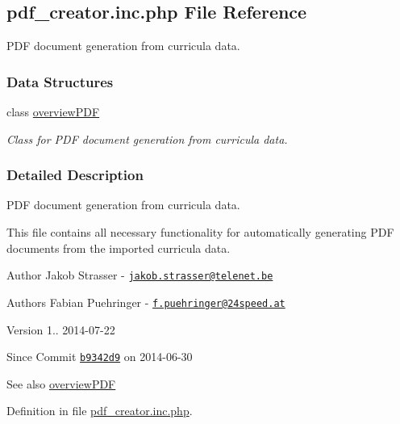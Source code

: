 \hypertarget{pdf__creator_8inc_8php}{\subsection{pdf\+\_\+creator.\+inc.\+php File Reference}
\label{pdf__creator_8inc_8php}
}


P\+D\+F document generation from curricula data.  


\subsubsection*{Data Structures}
\begin{DoxyCompactItemize}
\item 
class \hyperlink{classoverview_p_d_f}{overview\+P\+D\+F}
\begin{DoxyCompactList}\small\item\em Class for P\+D\+F document generation from curricula data. \end{DoxyCompactList}\end{DoxyCompactItemize}


\subsubsection{Detailed Description}
P\+D\+F document generation from curricula data. 

This file contains all necessary functionality for automatically generating P\+D\+F documents from the imported curricula data.

\begin{DoxyAuthor}{Author}
Jakob Strasser -\/ \href{mailto:jakob.strasser@telenet.be}{\tt jakob.\+strasser@telenet.\+be} 
\end{DoxyAuthor}
\begin{DoxyAuthor}{Authors}
Fabian Puehringer -\/ \href{mailto:f.puehringer@24speed.at}{\tt f.\+puehringer@24speed.\+at} 
\end{DoxyAuthor}
\begin{DoxyVersion}{Version}
1.. 2014-\/07-\/22 
\end{DoxyVersion}
\begin{DoxySince}{Since}
Commit \href{http://github.com/TheJake123/DrupalModul/commit/b9342d941b3f93e212f3f6af0823a07524dd5954}{\tt b9342d9} on 2014-\/06-\/30
\end{DoxySince}
\begin{DoxySeeAlso}{See also}
\hyperlink{classoverview_p_d_f}{overview\+P\+D\+F} 
\end{DoxySeeAlso}


Definition in file \hyperlink{pdf__creator_8inc_8php_source}{pdf\+\_\+creator.\+inc.\+php}.

